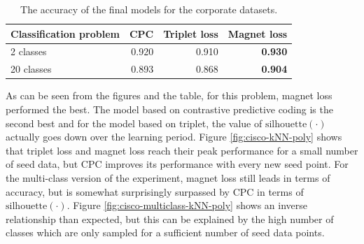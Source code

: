 \begin{table}
  \centering
  \begin{tabular}{lrrr}
    \toprule
    Classification problem & CPC   & Triplet loss & Magnet loss \\
    \midrule
    2 classes              & 0.920 & 0.910        & \textbf{0.930} \\
    20 classes             & 0.893 & 0.868        & \textbf{0.904} \\
    \bottomrule
  \end{tabular}
  \caption{The accuracy of the final models for the corporate datasets.}\label{tab:cisco-accuracy}
\end{table}

As can be seen from the figures and the table, for this problem, magnet loss performed the best. The model based on contrastive predictive coding is the second best and for the model based on triplet, the value of \( \mathrm{silhouette} \left( \cdot \right) \) actually goes down over the learning period. Figure \ref{fig:cisco-kNN-poly} shows that triplet loss and magnet loss reach their peak performance for a small number of seed data, but CPC improves its performance with every new seed point. For the multi-class version of the experiment, magnet loss still leads in terms of accuracy, but is somewhat surprisingly surpassed by CPC in terms of \( \mathrm{silhouette} \left( \cdot \right) \). Figure \ref{fig:cisco-multiclass-kNN-poly} shows an inverse relationship than expected, but this can be explained by the high number of classes which are only sampled for a sufficient number of seed data points.

